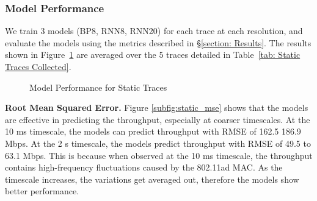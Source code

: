 \documentclass[sigconf,anonymous]{acmart}
\begin{document}
\subsubsection{Model Performance}
\label{subsubsection: Model Performance}

We train 3 models (BP8, RNN8, RNN20) for each trace at each resolution, and evaluate the models using the metrics described in \S \ref{section: Results}. The results shown in Figure~\ref{Static Conditions} are averaged over the 5 traces detailed in Table~\ref{tab: Static Traces Collected}.

\begin{figure}[h]
\centering
{}
\hfill
{}
\hfill
{}
\caption{Model Performance for Static Traces}
\label{Static Conditions}
\end{figure}

\textbf{Root Mean Squared Error.} Figure \ref{subfig:static_mse} shows that the models are effective in predicting the throughput, especially at coarser timescales. At the 10 ms timescale, the models can predict throughput with RMSE of 162.5 186.9 Mbps. At the 2 s timescale, the models predict throughput with RMSE of 49.5 to 63.1 Mbps. This is because when observed at the 10 ms timescale, the throughput contains high-frequency fluctuations caused by the 802.11ad MAC. As the timescale increases, the variations get averaged out, therefore the models show better performance.
\end{document}
